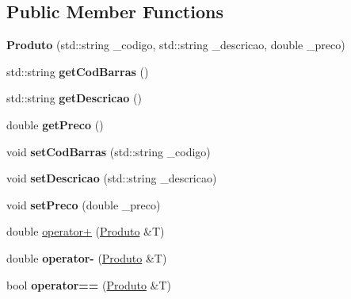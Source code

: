 \subsection*{Public Member Functions}
\begin{DoxyCompactItemize}
\item 
\mbox{\label{classProduto_a12dc783d4f1e016d1eefea0b3f83a6b0}} 
{\bfseries Produto} (std\+::string \+\_\+codigo, std\+::string \+\_\+descricao, double \+\_\+preco)
\item 
\mbox{\label{classProduto_aa8e9057d5f0ac3d145333223cb513b3e}} 
std\+::string {\bfseries get\+Cod\+Barras} ()
\item 
\mbox{\label{classProduto_ada2c72e139e09afa967aa06a4290d5f8}} 
std\+::string {\bfseries get\+Descricao} ()
\item 
\mbox{\label{classProduto_a53548783d7fad3ea6d5e000fa2227dcf}} 
double {\bfseries get\+Preco} ()
\item 
\mbox{\label{classProduto_a8f8e7d58e53d3f175bc41b2481dbf477}} 
void {\bfseries set\+Cod\+Barras} (std\+::string \+\_\+codigo)
\item 
\mbox{\label{classProduto_a35b8ac377821ca2197becf75e1063509}} 
void {\bfseries set\+Descricao} (std\+::string \+\_\+descricao)
\item 
\mbox{\label{classProduto_a207ec4b3438d376227ca3053a14669cf}} 
void {\bfseries set\+Preco} (double \+\_\+preco)
\item 
double \mbox{\hyperlink{classProduto_a4b1186b555e78a10bc43dceceb2fde23}{operator+}} (\mbox{\hyperlink{classProduto}{Produto}} \&T)
\item 
\mbox{\label{classProduto_a1d4f71551ca7db0485475e1492d2dab1}} 
double {\bfseries operator-\/} (\mbox{\hyperlink{classProduto}{Produto}} \&T)
\item 
\mbox{\label{classProduto_a847e805b411f2d893977662af67a2381}} 
bool {\bfseries operator==} (\mbox{\hyperlink{classProduto}{Produto}} \&T)
\end{DoxyCompactItemize}
